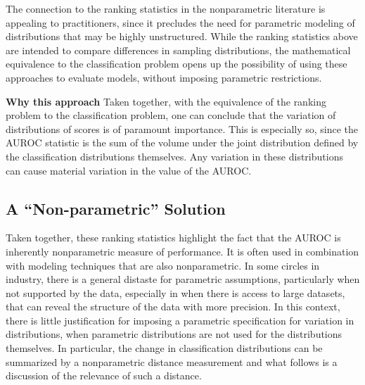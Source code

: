The connection to the ranking statistics in the nonparametric literature is appealing to practitioners, since it precludes the need for parametric modeling of distributions that may be highly unstructured. 
While the ranking statistics above are intended to compare differences in sampling distributions, the mathematical equivalence to the classification problem opens up the possibility of using these approaches to evaluate models, without imposing parametric restrictions. 


\textbf{Why this approach}
Taken together, with the equivalence of the ranking problem to the classification problem, 
% 
one can conclude that the variation of distributions of scores is of paramount importance. 
This is especially so, since the AUROC statistic is the sum of the volume under the joint distribution defined by the classification distributions themselves. 
Any variation in these distributions can cause material variation in the value of the AUROC. 


\subsection{A ``Non-parametric'' Solution}

Taken together, these ranking statistics highlight the fact that the AUROC is inherently nonparametric measure of performance. 
It is often used in combination with modeling techniques that are also nonparametric. 
% 
In some circles in industry, there is a general distaste for parametric assumptions, particularly when not supported by the data, especially in when there is access to large datasets, that can reveal the structure of the data with more precision. 
% 
In this context, there is little justification for imposing a parametric specification for variation in distributions, when parametric distributions are not used for the distributions themselves. 
% 
In particular, the change in classification distributions can be summarized by a nonparametric distance measurement and what follows is a discussion of the relevance of such a distance. 




